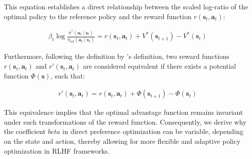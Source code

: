 This equation establishes a direct relationship between the scaled log-ratio of the optimal policy to the reference policy and the reward function $r(\mathbf{s}_t, \mathbf{a}_t)$:

\begin{align}
\beta_t \log \frac{\pi^*(\mathbf{a}_t \mid \mathbf{s}_t)}{\pi_{\text{ref}}(\mathbf{a}_t \mid \mathbf{s}_t)} = r(\mathbf{s}_t, \mathbf{a}_t) + V^*(\mathbf{s}_{t+1}) - V^*(\mathbf{s}_t)
\end{align}

Furthermore, following the definition by \citet{rafailov2024rqlanguagemodel}'s definition, two reward functions $r(\mathbf{s}_t, \mathbf{a}_t)$ and $r'(\mathbf{s}_t, \mathbf{a}_t)$ are considered equivalent if there exists a potential function $\Phi(\mathbf{s})$, such that:

\begin{align}
r'(\mathbf{s}_t, \mathbf{a}_t) =r(\mathbf{s}_t, \mathbf{a}_t) + \Phi(\mathbf{s}_{t+1})  - \Phi(\mathbf{s}_{t})
\end{align}

This equivalence implies that the optimal advantage function remains invariant under such transformations of the reward function. Consequently, we derive why the coefficient $beta$ in direct preference optimization can be variable, depending on the state and action, thereby allowing for more flexible and adaptive policy optimization in RLHF frameworks.



